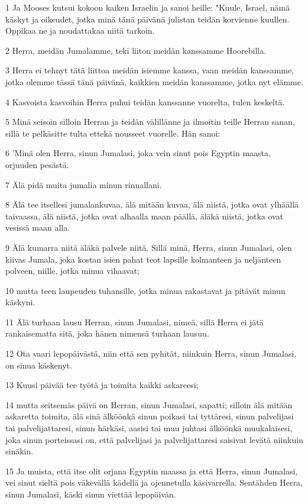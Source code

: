 \par 1 Ja Mooses kutsui kokoon kaiken Israelin ja sanoi heille: "Kuule, Israel, nämä käskyt ja oikeudet, jotka minä tänä päivänä julistan teidän korvienne kuullen. Oppikaa ne ja noudattakaa niitä tarkoin.
\par 2 Herra, meidän Jumalamme, teki liiton meidän kanssamme Hoorebilla.
\par 3 Herra ei tehnyt tätä liittoa meidän isiemme kanssa, vaan meidän kanssamme, jotka olemme tässä tänä päivänä, kaikkien meidän kanssamme, jotka nyt elämme.
\par 4 Kasvoista kasvoihin Herra puhui teidän kanssanne vuorelta, tulen keskeltä.
\par 5 Minä seisoin silloin Herran ja teidän välillänne ja ilmoitin teille Herran sanan, sillä te pelkäsitte tulta ettekä nousseet vuorelle. Hän sanoi:
\par 6 'Minä olen Herra, sinun Jumalasi, joka vein sinut pois Egyptin maasta, orjuuden pesästä.
\par 7 Älä pidä muita jumalia minun rinnallani.
\par 8 Älä tee itsellesi jumalankuvaa, älä mitään kuvaa, älä niistä, jotka ovat ylhäällä taivaassa, älä niistä, jotka ovat alhaalla maan päällä, äläkä niistä, jotka ovat vesissä maan alla.
\par 9 Älä kumarra niitä äläkä palvele niitä. Sillä minä, Herra, sinun Jumalasi, olen kiivas Jumala, joka kostan isien pahat teot lapsille kolmanteen ja neljänteen polveen, niille, jotka minua vihaavat;
\par 10 mutta teen laupeuden tuhansille, jotka minua rakastavat ja pitävät minun käskyni.
\par 11 Älä turhaan lausu Herran, sinun Jumalasi, nimeä, sillä Herra ei jätä rankaisematta sitä, joka hänen nimensä turhaan lausuu.
\par 12 Ota vaari lepopäivästä, niin että sen pyhität, niinkuin Herra, sinun Jumalasi, on sinua käskenyt.
\par 13 Kuusi päivää tee työtä ja toimita kaikki askareesi;
\par 14 mutta seitsemäs päivä on Herran, sinun Jumalasi, sapatti; silloin älä mitään askaretta toimita, älä sinä älköönkä sinun poikasi tai tyttäresi, sinun palvelijasi tai palvelijattaresi, sinun härkäsi, aasisi tai muu juhtasi älköönkä muukalaisesi, joka sinun porteissasi on, että palvelijasi ja palvelijattaresi saisivat levätä niinkuin sinäkin.
\par 15 Ja muista, että itse olit orjana Egyptin maassa ja että Herra, sinun Jumalasi, vei sinut sieltä pois väkevällä kädellä ja ojennetulla käsivarrella. Sentähden Herra, sinun Jumalasi, käski sinun viettää lepopäivän.
